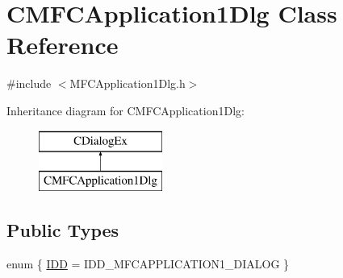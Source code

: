\hypertarget{class_c_m_f_c_application1_dlg}{}\section{C\+M\+F\+C\+Application1\+Dlg Class Reference}
\label{class_c_m_f_c_application1_dlg}


{\ttfamily \#include $<$M\+F\+C\+Application1\+Dlg.\+h$>$}

Inheritance diagram for C\+M\+F\+C\+Application1\+Dlg\+:\begin{figure}[H]
\begin{center}
\leavevmode
\includegraphics[height=2.000000cm]{class_c_m_f_c_application1_dlg}
\end{center}
\end{figure}
\subsection*{Public Types}
\begin{DoxyCompactItemize}
\item 
enum \{ \hyperlink{class_c_m_f_c_application1_dlg_a96dcbcf91ef69e15df06a47861ca7c86afedac1f82691e282d69aebf46cdde569}{I\+D\+D} = I\+D\+D\+\_\+\+M\+F\+C\+A\+P\+P\+L\+I\+C\+A\+T\+I\+O\+N1\+\_\+\+D\+I\+A\+L\+O\+G
 \}
\end{DoxyCompactItemize}
